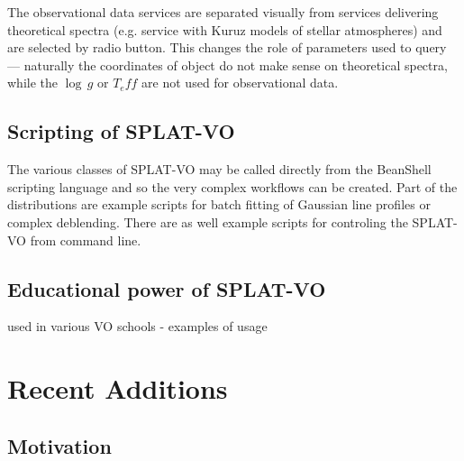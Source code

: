 \documentclass[final,authoryear,5p,times,twocolumn]{elsarticle}
\begin{document}
The observational data services are separated visually from services
delivering theoretical spectra (e.g. service with  Kuruz models of stellar
atmospheres) and are selected by radio button. This changes the role of
parameters used to query --- naturally the coordinates of object do not make
sense on theoretical spectra, while the $\log\,g$ or $T_eff$ are not used for
observational data.


\subsection{Scripting of SPLAT-VO}   

The various classes of SPLAT-VO may be called directly from the 
BeanShell scripting language \citep{niemeyer2013learning} and so the very complex workflows can be created.
Part of the distributions are example scripts for batch fitting of Gaussian line
profiles or complex deblending. There are as well example scripts for
controling the SPLAT-VO from command line.


\subsection{Educational power of SPLAT-VO}

used in various VO schools - examples of usage




\section{Recent Additions}


\subsection{Motivation}
\end{document}
